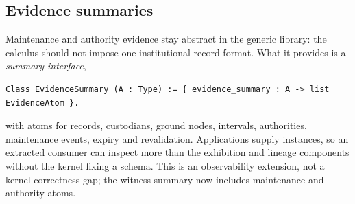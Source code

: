 \subsection{Evidence summaries}
Maintenance and authority evidence stay abstract in the generic library: the calculus should not impose one institutional record format. What it provides is a \emph{summary interface},
\begin{lstlisting}
Class EvidenceSummary (A : Type) := { evidence_summary : A -> list EvidenceAtom }.
\end{lstlisting}
with atoms for records, custodians, ground nodes, intervals, authorities, maintenance events, expiry and revalidation. Applications supply instances, so an extracted consumer can inspect more than the exhibition and lineage components without the kernel fixing a schema. This is an observability extension, not a kernel correctness gap; the witness summary now includes maintenance and authority atoms.
